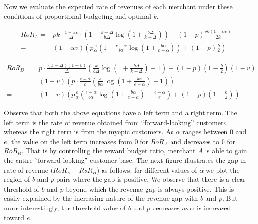 Now we evaluate the expected rate of revenues of each merchant under these conditions of proportional budgeting and optimal $k$.

\begin{align*}
RoR_A =& pk\cdot\frac{1-\alpha v}{\Delta}\cdot\left(1 - \frac{k-\Delta}{b\Delta}\log\left(1+\frac{b\Delta}{k-\Delta}\right)\right) + (1-p)\frac{bk(1-\alpha v)}{2k}\\
      =& (1-\alpha v) \left(p\frac{e}{\alpha}\left(1-\frac{e-\alpha}{b\alpha}\log\left(1+\frac{b\alpha}{e-\alpha}\right)\right) + (1-p)\frac{b}{2}\right)
\end{align*}

\begin{align*}
RoR_B =& p\cdot\frac{(k-\Delta)(1-v)}{\Delta}\left(\frac{k}{b\Delta}\log\left(1+\frac{b\Delta}{k-\Delta}\right) - 1\right) + (1-p)(1-\frac{b}{2})(1-v)\\
      =& (1-v)\left(p\cdot\frac{e-\alpha}{\alpha}\left(\frac{e}{b\alpha}\log\left(1+\frac{b\alpha}{e-\alpha}\right) - 1\right)\right)\\
      =& (1-v)\left(p\frac{e}{\alpha}\left(\frac{e-\alpha}{b\alpha}\log\left(1+\frac{b\alpha}{e-\alpha}\right) - \frac{e-\alpha}{e}\right) + (1-p)(1-\frac{b}{2})\right)
\end{align*}

Observe that both the above equations have a left term and a right term. The left term is the rate of revenue obtained from ``forward-looking'' customers whereas the right term is from the myopic customers.
As $\alpha$ ranges between $0$ and $e$, the value on the left term increases from $0$ for $RoR_A$ and decreases to $0$ for $RoR_B$.
That is by controlling the reward budget ratio, merchant $A$ is able to gain the entire ``forward-looking'' customer base.
The next figure illustrates the gap in rate of revenue ($RoR_A - RoR_B$) as follows: for different values of $\alpha$ we plot the region of $b$ and $p$ pairs where the gap is positive.
We observe that there is a clear threshold of $b$ and $p$ beyond which the revenue gap is always positive.
This is easily explained by the increasing nature of the revenue gap with $b$ and $p$.
But more interestingly, the threshold value of $b$ and $p$ decreases as $\alpha$ is increased toward $e$.

